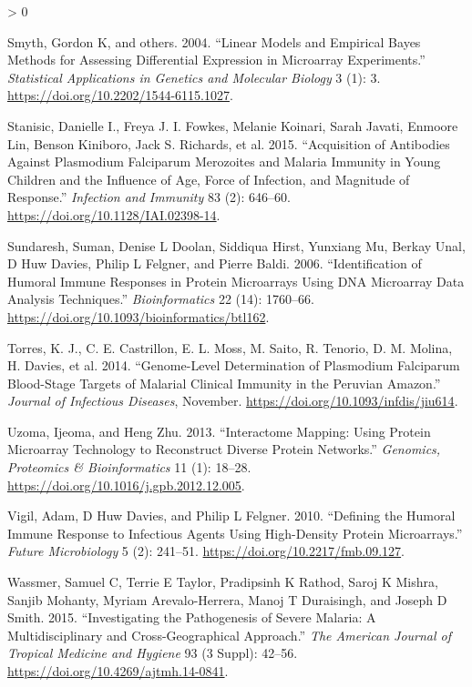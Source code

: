 \documentclass[
  a4paper]{article}
\newlength{\cslhangindent}
\newenvironment{CSLReferences}[2] %
 {%
  \setlength{\parindent}{0pt}
  \ifodd #1 \everypar{\setlength{\hangindent}{\cslhangindent}}\ignorespaces\fi
  \ifnum #2 > 0
  \setlength{\parskip}{#2\baselineskip}
  \fi
 }%
 {}
\begin{document}
\begin{CSLReferences}{1}{0}
\leavevmode\hypertarget{ref-smyth2004ebayes}{}%
Smyth, Gordon K, and others. 2004. {``Linear Models and Empirical Bayes
Methods for Assessing Differential Expression in Microarray
Experiments.''} \emph{Statistical Applications in Genetics and Molecular
Biology} 3 (1): 3. \url{https://doi.org/10.2202/1544-6115.1027}.

\leavevmode\hypertarget{ref-Stanisic2015}{}%
Stanisic, Danielle I., Freya J. I. Fowkes, Melanie Koinari, Sarah
Javati, Enmoore Lin, Benson Kiniboro, Jack S. Richards, et al. 2015.
{``Acquisition of Antibodies Against Plasmodium Falciparum Merozoites
and Malaria Immunity in Young Children and the Influence of Age, Force
of Infection, and Magnitude of Response.''} \emph{Infection and
Immunity} 83 (2): 646--60. \url{https://doi.org/10.1128/IAI.02398-14}.

\leavevmode\hypertarget{ref-sundaresh2006}{}%
Sundaresh, Suman, Denise L Doolan, Siddiqua Hirst, Yunxiang Mu, Berkay
Unal, D Huw Davies, Philip L Felgner, and Pierre Baldi. 2006.
{``Identification of Humoral Immune Responses in Protein Microarrays
Using DNA Microarray Data Analysis Techniques.''} \emph{Bioinformatics}
22 (14): 1760--66. \url{https://doi.org/10.1093/bioinformatics/btl162}.

\leavevmode\hypertarget{ref-Torres2014asymptomatic}{}%
Torres, K. J., C. E. Castrillon, E. L. Moss, M. Saito, R. Tenorio, D. M.
Molina, H. Davies, et al. 2014. {``Genome-Level Determination of
Plasmodium Falciparum Blood-Stage Targets of Malarial Clinical Immunity
in the {Peruvian Amazon}.''} \emph{Journal of Infectious Diseases},
November. \url{https://doi.org/10.1093/infdis/jiu614}.

\leavevmode\hypertarget{ref-uzoma2013interactome}{}%
Uzoma, Ijeoma, and Heng Zhu. 2013. {``Interactome Mapping: Using Protein
Microarray Technology to Reconstruct Diverse Protein Networks.''}
\emph{Genomics, Proteomics \& Bioinformatics} 11 (1): 18--28.
\url{https://doi.org/10.1016/j.gpb.2012.12.005}.

\leavevmode\hypertarget{ref-vigil2010}{}%
Vigil, Adam, D Huw Davies, and Philip L Felgner. 2010. {``Defining the
Humoral Immune Response to Infectious Agents Using High-Density Protein
Microarrays.''} \emph{Future Microbiology} 5 (2): 241--51.
\url{https://doi.org/10.2217/fmb.09.127}.

\leavevmode\hypertarget{ref-wassmer2015}{}%
Wassmer, Samuel C, Terrie E Taylor, Pradipsinh K Rathod, Saroj K Mishra,
Sanjib Mohanty, Myriam Arevalo-Herrera, Manoj T Duraisingh, and Joseph D
Smith. 2015. {``Investigating the Pathogenesis of Severe Malaria: A
Multidisciplinary and Cross-Geographical Approach.''} \emph{The American
Journal of Tropical Medicine and Hygiene} 93 (3 Suppl): 42--56.
\url{https://doi.org/10.4269/ajtmh.14-0841}.


\end{CSLReferences}
\end{document}
